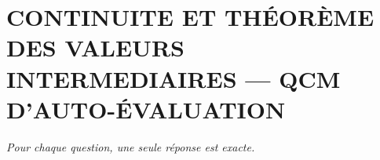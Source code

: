 
\section*{\textcolor{chapcolor}{\MakeUppercase{Continuite et théorème des valeurs intermediaires — QCM d'auto-évaluation}}}

\begin{center}
\textit{Pour chaque question, une seule réponse est exacte.}
\end{center}

